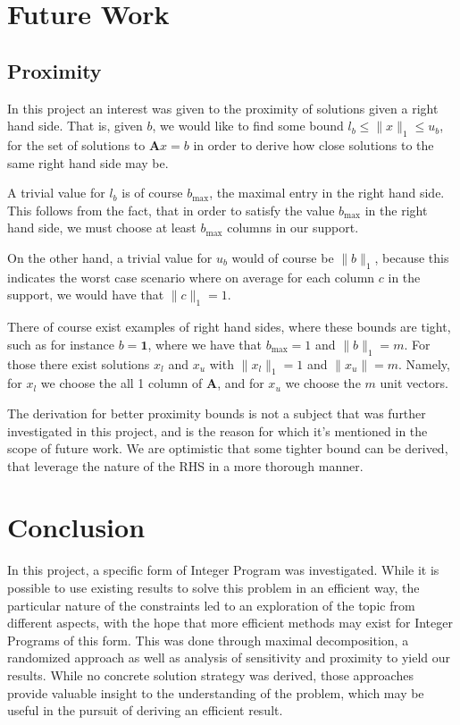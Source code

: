 \documentclass{article}
\newcommand\norm[1]{\lVert#1\rVert}
\begin{document}
\section{Future Work}
\subsection{Proximity}
In this project an interest was given to the proximity of solutions given a right hand side.
That is, given $b$, we would like to find some bound $l_b \leq \norm{x}_1 \leq u_b$, for the set of solutions to $\mathbf{A}x = b$ in order to derive how close solutions to the same right hand side may be. 

A trivial value for $l_{b}$ is of course $b_{\max}$, the maximal entry in the right hand side. This follows from the fact, that in order to satisfy the value $b_{\max}$ in the right hand side, we must choose at least $b_{\max}$ columns in our support. 

On the other hand, a trivial value for $ u_{b} $ would of course be $ \norm{b}_1 $, because this indicates the worst case scenario where on average for each column $ c $ in the support, we would have that $ \norm{c}_1 = 1 $.

There of course exist examples of right hand sides, where these bounds are tight, such as for instance $ b = \mathbf{1} $, where we have that $ b_{\max} = 1 $ and $ \norm{b}_1 = m $. For those there exist solutions $ x_l $ and $ x_u $ with $ \norm{x_l}_1 = 1 $ and $\norm{x_u} = m $. Namely, for $ x_l  $ we choose the all 1 column of $ \mathbf{A} $, and for $ x_u $ we choose the $ m $ unit vectors. 

The derivation for better proximity bounds is not a subject that was further investigated in this project, and is the reason for which it's mentioned in the scope of future work. We are optimistic that some tighter bound can be derived, that leverage the nature of the RHS in a more thorough manner. 

\section{Conclusion}
In this project, a specific form of Integer Program was investigated. While it is possible to  use existing results to solve this problem in an efficient way, the particular nature of the constraints led to an exploration of the topic from different aspects, with the hope that more efficient methods may exist for Integer Programs of this form. This was done through maximal decomposition, a randomized approach as well as analysis of sensitivity and proximity to yield our results. While no concrete solution strategy was derived, those approaches provide valuable insight to the understanding of the problem, which may be useful in the pursuit of deriving an efficient result. 
\end{document}
